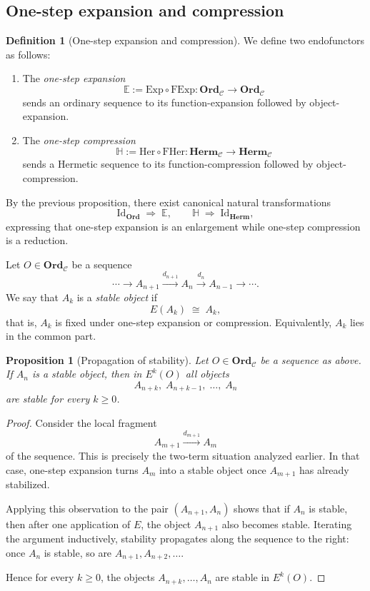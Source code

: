 \documentclass[11pt]{book}
\theoremstyle{definition}
\newtheorem{definition}{Definition}[section]
\theoremstyle{plain}
\newtheorem{proposition}[theorem]{Proposition}
\theoremstyle{remark}
\begin{document}
\subsection{One-step expansion and compression}

\begin{definition}[One-step expansion and compression]
We define two endofunctors as follows:
\begin{enumerate}
    \item The \emph{one-step expansion} 
    \[
    \mathbb{E} := \mathrm{Exp}\circ \mathrm{FExp} : 
    \mathbf{Ord}_{\mathcal C} \to \mathbf{Ord}_{\mathcal C}
    \]
    sends an ordinary sequence to its function-expansion 
    followed by object-expansion.
    \item The \emph{one-step compression}
    \[
    \mathbb{H} := \mathrm{Her}\circ \mathrm{FHer} : 
    \mathbf{Herm}_{\mathcal C} \to \mathbf{Herm}_{\mathcal C}
    \]
    sends a Hermetic sequence to its function-compression 
    followed by object-compression.
\end{enumerate}
\end{definition}

By the previous proposition, there exist canonical natural transformations
\[
\mathrm{Id}_{\mathbf{Ord}}\;\Rightarrow\;\mathbb{E}, 
\qquad
\mathbb{H}\;\Rightarrow\;\mathrm{Id}_{\mathbf{Herm}},
\]
expressing that one-step expansion is an enlargement 
while one-step compression is a reduction.


Let $O\in \mathbf{Ord}_\mathcal C$ be a sequence 
\[
\cdots \longrightarrow A_{n+1} \xrightarrow{d_{n+1}} A_{n} \xrightarrow{d_{n}} A_{n-1} \longrightarrow \cdots .
\]
We say that $A_k$ is a \emph{stable object} if 
\[
E(A_k) \;\cong\; A_k ,
\]
that is, $A_k$ is fixed under one-step expansion or compression. Equivalently, $A_k$ lies in the common part.


\begin{proposition}[Propagation of stability]
Let $O\in \mathbf{Ord}_\mathcal C$ be a sequence as above. 
If $A_n$ is a stable object, then in $E^k(O)$ all objects 
\[
A_{n+k},\; A_{n+k-1},\;\dots,\; A_{n}
\]
are stable for every $k\geq 0$.
\end{proposition}

\begin{proof}
Consider the local fragment 
\[
A_{m+1} \xrightarrow{d_{m+1}} A_m
\]
of the sequence. This is precisely the two-term situation analyzed earlier. 
In that case, one-step expansion turns $A_m$ into a stable object once $A_{m+1}$ has already stabilized. 

Applying this observation to the pair $(A_{n+1},A_n)$ shows that if $A_n$ is stable, then after one application of $E$, the object $A_{n+1}$ also becomes stable. Iterating the argument inductively, stability propagates along the sequence to the right: once $A_n$ is stable, so are $A_{n+1}, A_{n+2}, \dots$. 

Hence for every $k\geq 0$, the objects $A_{n+k},\dots,A_n$ are stable in $E^k(O)$. 
\end{proof}
\end{document}
